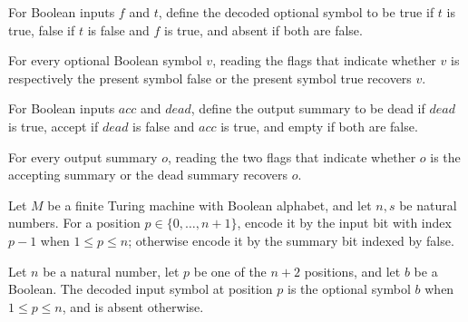 \begin{definition}
\label{Complexity.codecReadSymbol}
\leanok
For Boolean inputs $f$ and $t$, define the decoded optional symbol to be true if $t$ is
true, false if $t$ is false and $f$ is true, and absent if both are false.
\end{definition}

\begin{theorem}
\label{Complexity.codecReadSymbol_flags}
\leanok
{}
For every optional Boolean symbol $v$, reading the flags that indicate whether $v$ is
respectively the present symbol false or the present symbol true recovers $v$.
\end{theorem}

\begin{definition}
\label{Complexity.codecReadSummary}
\leanok
{}
For Boolean inputs $acc$ and $dead$, define the output summary to be dead if $dead$ is
true, accept if $dead$ is false and $acc$ is true, and empty if both are false.
\end{definition}

\begin{theorem}
\label{Complexity.codecReadSummary_flags}
\leanok
{}
For every output summary $o$, reading the two flags that indicate whether $o$ is the
accepting summary or the dead summary recovers $o$.
\end{theorem}

\begin{definition}
\label{Complexity.codecInputWire}
\leanok
{}
Let $M$ be a finite Turing machine with Boolean alphabet, and let $n,s$ be natural
numbers. For a position $p\in\{0,\ldots,n+1\}$, encode it by the input bit with index
$p-1$ when $1\le p\le n$; otherwise encode it by the summary bit indexed by false.
\end{definition}

\begin{definition}
\label{Complexity.codecInputRead}
\leanok
Let $n$ be a natural number, let $p$ be one of the $n+2$ positions, and let $b$ be a
Boolean. The decoded input symbol at position $p$ is the optional symbol $b$ when $1\le
p\le n$, and is absent otherwise.
\end{definition}

